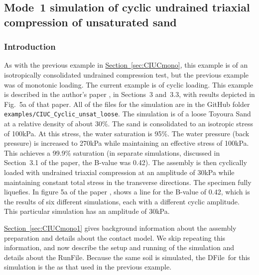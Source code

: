 \documentclass[letterpaper,11pt]{article}
\newcommand{\RunFile}{\textsf{RunFile}}
\newcommand{\DFile}{\textsf{DFile}}
\begin{document}
\subsection{Mode~1 simulation of cyclic undrained triaxial compression of unsaturated sand}\label{sec:CIUCcyclic}
%
\subsubsection{Introduction}
As with the previous example in
\hyperref[sec:CIUCmono]{Section~\ref*{sec:CIUCmono}},
this example is of an isotropically consolidated
undrained compression test,
but the previous example was of monotonic loading.
The current example is of cyclic loading.
This example is described in the author's paper \cite{Kuhn:2020a},
in Sections~3 and~3.3, with results depicted
in Fig.~5a of that paper.
All of the files for the simulation
are in the GitHub folder
\texttt{examples/CIUC\_Cyclic\_unsat\_loose}.
The simulation is of a loose Toyoura Sand 
at a relative density of about 30\%.
The sand is consolidated to an isotropic stress
of 100kPa.
At this stress, the water saturation is 95\%.
The water pressure (back pressure) is increased
to 270kPa while maintaining an effective stress
of 100kPa.
This achieves a 99.9\% saturation
(in separate simulations, discussed in Section~3.1
of the paper, the B-value was 0.42).
The assembly is then cyclically loaded
with undrained triaxial
compression at an amplitude of 30kPa
while maintaining constant total stress
in the transverse directions.
The specimen fully liquefies.
In figure 5a of the paper \cite{Kuhn:2020a},
shows a line for the B-value of 0.42, which
is the results of six different simulations,
each with a different cyclic amplitude.
This particular simulation has an amplitude
of 30kPa.
%
\par
\hyperref[sec:CIUCmono1]{Section~\ref*{sec:CIUCmono1}}
gives background information about the assembly
preparation and details about the contact model.
We skip repeating this information,
and now describe the setup and running
of the simulation and details about the \RunFile.
Because the same soil is simulated,
the \DFile\ for this simulation is the as that used
in the previous example.
%
%
\end{document}
